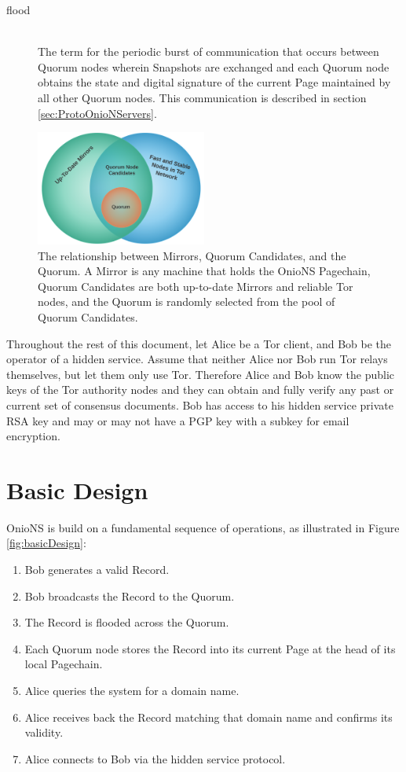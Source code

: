 \begin{description}
	\item[flood] \hfill \\
		The term for the periodic burst of communication that occurs between Quorum nodes wherein Snapshots are exchanged and each Quorum node obtains the state and digital signature of the current Page maintained by all other Quorum nodes. This communication is described in section \ref{sec:ProtoOnioNServers}.
\end{description}

\begin{figure}[htbp]
	\centering
	\includegraphics[width=0.5\textwidth]{images/LucidCharts/Participants.png}
	\caption{The relationship between Mirrors, Quorum Candidates, and the Quorum. A Mirror is any machine that holds the OnioNS Pagechain, Quorum Candidates are both up-to-date Mirrors and reliable Tor nodes, and the Quorum is randomly selected from the pool of Quorum Candidates.}
\end{figure}

Throughout the rest of this document, let Alice be a Tor client, and Bob be the operator of a hidden service. Assume that neither Alice nor Bob run Tor relays themselves, but let them only use Tor. Therefore Alice and Bob know the public keys of the Tor authority nodes and they can obtain and fully verify any past or current set of consensus documents. Bob has access to his hidden service private RSA key and may or may not have a PGP key with a subkey for email encryption.

\section{Basic Design}
\label{sec:BasicDesign}

OnioNS is build on a fundamental sequence of operations, as illustrated in Figure \ref{fig:basicDesign}:

\begin{enumerate}
	\item Bob generates a valid Record.
	\item Bob broadcasts the Record to the Quorum.
	\item The Record is flooded across the Quorum.
	\item Each Quorum node stores the Record into its current Page at the head of its local Pagechain.
	\item Alice queries the system for a domain name.
	\item Alice receives back the Record matching that domain name and confirms its validity.
	\item Alice connects to Bob via the hidden service protocol.
\end{enumerate}

